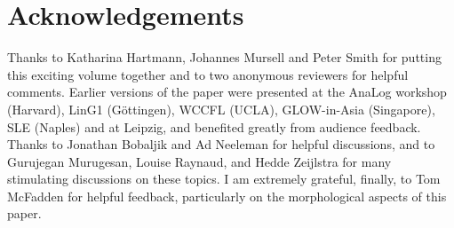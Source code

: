 \documentclass[output=paper, modfonts, nonflat]{langsci/langscibook}
\begin{document}
\section*{Acknowledgements}
Thanks to Katharina Hartmann, Johannes Mursell and Peter Smith for
putting this exciting volume together and to two anonymous reviewers
for helpful comments.  Earlier versions of the paper were presented at
the AnaLog workshop (Harvard), LinG1 (Göttingen), WCCFL (UCLA),
GLOW-in-Asia (Singapore), SLE (Naples) and at Leipzig, and benefited
greatly from audience feedback. Thanks to Jonathan Bobaljik and Ad
Neeleman for helpful discussions, and to Gurujegan Murugesan, Louise
Raynaud, and Hedde Zeijlstra for many stimulating discussions on these
topics.  I am extremely grateful, finally, to Tom McFadden for helpful
feedback, particularly on the morphological aspects of this paper.

{\sloppy\printbibliography[heading=subbibliography,notkeyword=this]}
\end{document}
